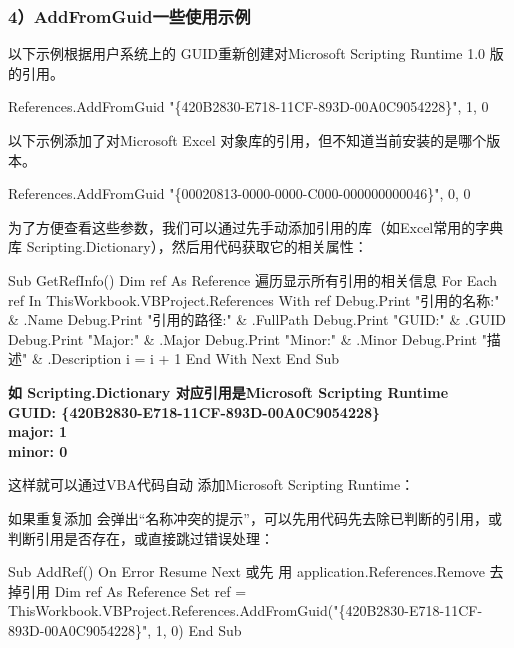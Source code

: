 \documentclass[
]{article}
\newenvironment{Shaded}{}{}
\newcommand{\NormalTok}[1]{#1}
\begin{document}
\subsubsection{\texorpdfstring{\textbf{4）}AddFromGuid一些使用\textbf{示例}}{4）AddFromGuid一些使用示例}}\label{4uxff09addfromguidux4e00ux4e9bux4f7fux7528ux793aux4f8b}

以下示例根据用户系统上的 GUID重新创建对Microsoft Scripting Runtime 1.0
版的引用。

References.AddFromGuid "\{420B2830-E718-11CF-893D-00A0C9054228\}", 1, 0

以下示例添加了对Microsoft Excel
对象库的引用，但不知道当前安装的是哪个版本。

References.AddFromGuid "\{00020813-0000-0000-C000-000000000046\}", 0, 0

为了方便查看这些参数，我们可以通过先手动添加引用的库（如Excel常用的字典库
Scripting.Dictionary），然后用代码获取它的相关属性：

\begin{Shaded}
\begin{Highlighting}[]
\NormalTok{Sub GetRefInfo()}
\NormalTok{    Dim ref As Reference}
\NormalTok{        \textquotesingle{}遍历显示所有引用的相关信息}
\NormalTok{        For Each ref In ThisWorkbook.VBProject.References}
\NormalTok{            With ref}
\NormalTok{                Debug.Print "引用的名称:" \& .Name}
\NormalTok{                Debug.Print "引用的路径:" \& .FullPath}
\NormalTok{                Debug.Print "GUID:" \& .GUID}
\NormalTok{                Debug.Print "Major:" \& .Major}
\NormalTok{                Debug.Print "Minor:" \& .Minor}
\NormalTok{                Debug.Print "描述" \& .Description}
\NormalTok{                i = i + 1}
\NormalTok{            End With}
\NormalTok{        Next}
\NormalTok{End Sub}
\end{Highlighting}
\end{Shaded}

\textbf{如 Scripting.Dictionary 对应引用是Microsoft Scripting Runtime}\\
\textbf{GUID: \{420B2830-E718-11CF-893D-00A0C9054228\}}\\
\textbf{major: 1}\\
\textbf{minor: 0}

这样就可以通过VBA代码自动 添加Microsoft Scripting Runtime：

如果重复添加
会弹出``名称冲突的提示''，可以先用代码先去除已判断的引用，或判断引用是否存在，或直接跳过错误处理：

\begin{Shaded}
\begin{Highlighting}[]
\NormalTok{Sub AddRef()}
\NormalTok{    On Error Resume Next \textquotesingle{}或先 用 application.References.Remove  去掉引用}
\NormalTok{    Dim ref As Reference}
\NormalTok{    Set ref = ThisWorkbook.VBProject.References.AddFromGuid("\{420B2830{-}E718{-}11CF{-}893D{-}00A0C9054228\}", 1, 0)}
\NormalTok{End Sub}
\end{Highlighting}
\end{Shaded}
\end{document}
